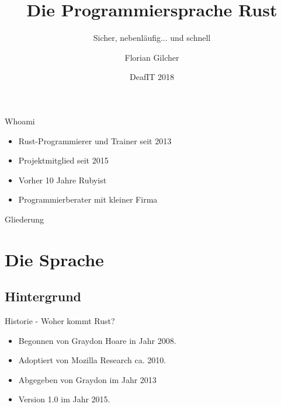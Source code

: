 \documentclass{beamer}
\title[Die Programmiersprache Rust] %
{Die Programmiersprache Rust}
\subtitle
{Sicher, nebenläufig... und schnell}
\author 
{Florian Gilcher}
\institute
{
  CEO und Rust-Trainer\\
  Ferrous Systems GmbH }
\date
{DeafIT 2018}
\begin{document}
\newcommand{\one}{\ding{202}}
\newcommand{\two}{\ding{203}}
\newcommand{\three}{\ding{204}}

\begin{frame}
	\titlepage
\end{frame}


\begin{frame}{Whoami}

	\begin{itemize}
		\item
		      Rust-Programmierer und Trainer seit 2013
		\item
			  Projektmitglied seit 2015
		\item
			  Vorher 10 Jahre Rubyist
		\item
			  Programmierberater mit kleiner Firma
	\end{itemize}
\end{frame}

\begin{frame}{Gliederung}
	\tableofcontents

\end{frame}


\section{Die Sprache}

\subsection{Hintergrund}

\begin{frame}{Historie - Woher kommt Rust?}

	\begin{itemize}
		\item
		      Begonnen von Graydon Hoare in Jahr 2008.
		\item
			  Adoptiert von Mozilla Research ca. 2010.
		\item
		      Abgegeben von Graydon im Jahr 2013
		\item
		      Version 1.0 im Jahr 2015.
	\end{itemize}
\end{frame}
\end{document}
